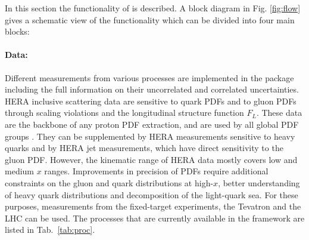 %
\label{sec:structure}


In this section the functionality of \fitter is described.
A block diagram in Fig. \ref{fig:flow} gives a schematic view
of the \fitter functionality which can be divided into four main blocks:

\paragraph{Data:} Different measurements from various processes
are implemented in the \fitter package including the full information on their uncorrelated 
and correlated uncertainties. HERA inclusive scattering data 
are sensitive to quark PDFs and to gluon PDFs through scaling violations and the longitudinal structure function $F_L$.  
These data are the backbone of any proton PDF extraction,
and are used by all global PDF groups \cite{MSTWpdf,CT10pdf,NNPDFpdf,Alekhin:2013nda,Jimenez-Delgado:2014twa}.  They can be supplemented by HERA measurements sensitive to heavy quarks and by HERA jet measurements, which have direct sensitivity to the gluon PDF.
However, the kinematic range of HERA data mostly covers low and medium $x$ ranges.
Improvements in precision of PDFs require additional constraints on the gluon and 
quark distributions at high-$x$, better understanding of heavy quark distributions and 
decomposition of the light-quark sea.  For these purposes, measurements from the fixed-target 
experiments, the Tevatron and the LHC can be used.
%
%
The processes that are currently available in the \fitter framework are listed in Tab.~\ref{tab:proc}.

